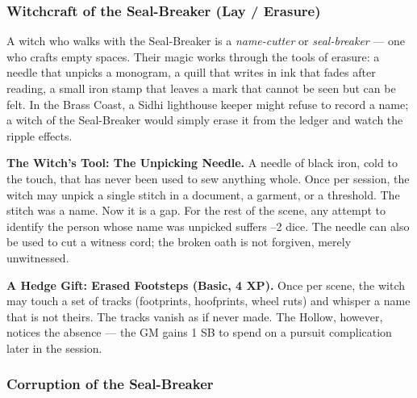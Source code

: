 \subsubsection*{Witchcraft of the Seal-Breaker (Lay / Erasure)}

A witch who walks with the Seal-Breaker is a \textit{name-cutter} or \textit{seal-breaker} --- one who crafts empty spaces. Their magic works through the tools of erasure: a needle that unpicks a monogram, a quill that writes in ink that fades after reading, a small iron stamp that leaves a mark that cannot be seen but can be felt. In the Brass Coast, a Sidhi lighthouse keeper might refuse to record a name; a witch of the Seal-Breaker would simply erase it from the ledger and watch the ripple effects.

\textbf{The Witch's Tool: The Unpicking Needle.} A needle of black iron, cold to the touch, that has never been used to sew anything whole. Once per session, the witch may unpick a single stitch in a document, a garment, or a threshold. The stitch was a name. Now it is a gap. For the rest of the scene, any attempt to identify the person whose name was unpicked suffers --2 dice. The needle can also be used to cut a witness cord; the broken oath is not forgiven, merely unwitnessed.

\textbf{A Hedge Gift: Erased Footsteps (Basic, 4 XP).} Once per scene, the witch may touch a set of tracks (footprints, hoofprints, wheel ruts) and whisper a name that is not theirs. The tracks vanish as if never made. The Hollow, however, notices the absence --- the GM gains 1 SB to spend on a pursuit complication later in the session.

\subsubsection*{Corruption of the Seal-Breaker}

